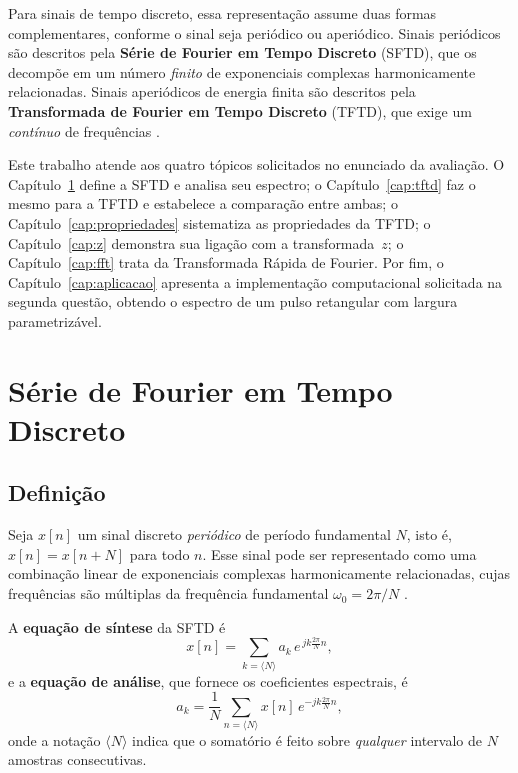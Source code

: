 \documentclass[
    12pt,
    openright,
    oneside,
    a4paper,
    chapter=TITLE,
    section=TITLE,
    brazil
]{abntex2}
\begin{document}
Para sinais de tempo discreto, essa representação assume duas formas complementares,
conforme o sinal seja periódico ou aperiódico. Sinais periódicos são descritos pela
\textbf{Série de Fourier em Tempo Discreto} (SFTD), que os decompõe em um número
\emph{finito} de exponenciais complexas harmonicamente relacionadas. Sinais aperiódicos
de energia finita são descritos pela \textbf{Transformada de Fourier em Tempo Discreto}
(TFTD), que exige um \emph{contínuo} de frequências \cite{haykin1999}.

Este trabalho atende aos quatro tópicos solicitados no enunciado da avaliação. O
Capítulo~\ref{cap:sftd} define a SFTD e analisa seu espectro; o Capítulo~\ref{cap:tftd}
faz o mesmo para a TFTD e estabelece a comparação entre ambas; o
Capítulo~\ref{cap:propriedades} sistematiza as propriedades da TFTD; o
Capítulo~\ref{cap:z} demonstra sua ligação com a transformada~$z$; o
Capítulo~\ref{cap:fft} trata da Transformada Rápida de Fourier. Por fim, o
Capítulo~\ref{cap:aplicacao} apresenta a implementação computacional solicitada na
segunda questão, obtendo o espectro de um pulso retangular com largura parametrizável.

\newpage

\chapter{Série de Fourier em Tempo Discreto}
\label{cap:sftd}

\section{Definição}

Seja $x[n]$ um sinal discreto \emph{periódico} de período fundamental $N$, isto é,
$x[n] = x[n+N]$ para todo $n$. Esse sinal pode ser representado como uma combinação
linear de exponenciais complexas harmonicamente relacionadas, cujas frequências são
múltiplas da frequência fundamental $\omega_0 = 2\pi/N$ \cite{haykin1999}.

A \textbf{equação de síntese} da SFTD é
\begin{equation}
    x[n] = \sum_{k=\langle N\rangle} a_k\, e^{\,jk\frac{2\pi}{N}n},
    \label{eq:sftd-sintese}
\end{equation}
e a \textbf{equação de análise}, que fornece os coeficientes espectrais, é
\begin{equation}
    a_k = \frac{1}{N}\sum_{n=\langle N\rangle} x[n]\, e^{-jk\frac{2\pi}{N}n},
    \label{eq:sftd-analise}
\end{equation}
onde a notação $\langle N\rangle$ indica que o somatório é feito sobre \emph{qualquer}
intervalo de $N$ amostras consecutivas.
\end{document}
